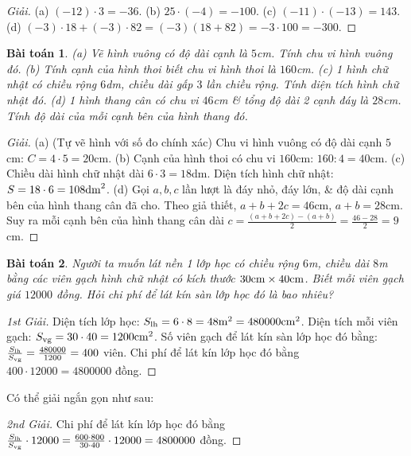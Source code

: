 \documentclass{article}
\numberwithin{equation}{section}
\newtheorem{baitoan}{Bài toán}[section]
\begin{document}
\begin{proof}[Giải]
	(a) $(-12)\cdot3 = -36$. (b) $25\cdot(-4) = -100$. (c) $(-11)\cdot(-13) = 143$. (d) $(-3)\cdot18 + (-3)\cdot82 = (-3)(18 + 82) = -3\cdot100 = -300$.
\end{proof}

\begin{baitoan}
	(a) Vẽ hình vuông có độ dài cạnh là $5$\emph{cm}. Tính chu vi hình vuông đó. (b) Tính cạnh của hình thoi biết chu vi hình thoi là $160$\emph{cm}. (c) 1 hình chữ nhật có chiều rộng $6$\emph{dm}, chiều dài gấp $3$ lần chiều rộng. Tính diện tích hình chữ nhật đó. (d) 1 hình thang cân có chu vi $46$\emph{cm} \& tổng độ dài 2 cạnh đáy là $28$\emph{cm}. Tính độ dài của mỗi cạnh bên của hình thang đó.
\end{baitoan}

\begin{proof}[Giải]
	(a) (Tự vẽ hình với số đo chính xác) Chu vi hình vuông có độ dài cạnh $5$cm: $C = 4\cdot5 = 20$cm. (b) Cạnh của hình thoi có chu vi $160$cm: $160:4 = 40$cm. (c) Chiều dài hình chữ nhật dài $6\cdot3 = 18$dm. Diện tích hình chữ nhật: $S = 18\cdot6 = 108{\rm dm}^2$. (d) Gọi $a,b,c$ lần lượt là đáy nhỏ, đáy lớn, \& độ dài cạnh bên của hình thang cân đã cho. Theo giả thiết, $a + b + 2c = 46$cm, $a + b = 28$cm. Suy ra mỗi cạnh bên của hình thang cân dài $c = \frac{(a + b + 2c) - (a + b)}{2} = \frac{46 - 28}{2} = 9$cm.
\end{proof}

\begin{baitoan}
	Người ta muốn lát nền 1 lớp học có chiều rộng $6$\emph{m}, chiều dài $8$\emph{m} bằng các viên gạch hình chữ nhật có kích thước $\rm30cm\times40cm$. Biết mỗi viên gạch giá $12000$ đồng. Hỏi chi phí để lát kín sàn lớp học đó là bao nhiêu?
\end{baitoan}

\begin{proof}[1st Giải]
	Diện tích lớp học: $S_{\rm lh} = 6\cdot8 = 48{\rm m}^2 = 480000{\rm cm}^2$. Diện tích mỗi viên gạch: $S_{\rm vg} = 30\cdot40 = 1200{\rm cm}^2$. Số viên gạch để lát kín sàn lớp học đó bằng: $\frac{S_{\rm lh}}{S_{\rm vg}} = \frac{480000}{1200} = 400$ viên. Chi phí để lát kín lớp học đó bằng $400\cdot12000 = 4800000$ đồng.
\end{proof}
Có thể giải ngắn gọn như sau:

\begin{proof}[2nd Giải]
	Chi phí để lát kín lớp học đó bằng $\frac{S_{\rm lh}}{S_{\rm vg}}\cdot12000 = \frac{600\cdot800}{30\cdot40}\cdot12000 = 4800000$ đồng.
\end{proof}


\printbibliography[heading=bibintoc]
	
\end{document}
